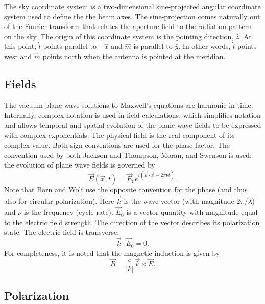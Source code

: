 \documentclass{article}
\begin{document}
The sky coordinate system is a two-dimensional sine-projected angular 
coordinate system used to define the the beam axes.  The sine-projection
comes naturally out of the Fourier transform that relates the aperture
field to the radiation pattern on the sky.  The origin of this coordinate 
system is the pointing direction, $\hat{z}$.  At this point, 
$\hat{l}$ points parallel to $-\hat{x}$ and $\hat{m}$ is parallel to $\hat{y}$.
In other words, $\hat{l}$ points west and $\hat{m}$ points north when the
antenna is pointed at the meridian.

\subsection{Fields}

The vacuum plane wave solutions to Maxwell's equations are harmonic in time.
Internally, complex notation is used in field calculations, which simplifies
notation and allows temporal and spatial evolution of the plane wave fields to 
be expressed with complex exponentials.  The physical
field is the real component of its complex value.  Both sign conventions are 
used for the phase factor.  The convention used by both Jackson and 
Thompson, Moran, and Swenson is used; the evolution of plane wave 
fields is governed by
\begin{equation} \label{eqn:phase}
\vec{E}(\vec{x}, t) = \vec{E}_0 e^{i (\vec{k} \cdot \vec{x} - 2 \pi \nu t)}.
\end{equation}
Note that Born and Wolf use the opposite convention for the phase (and thus
also for circular polarization).
Here $\vec{k}$ is the wave vector (with magnitude $2 \pi / \lambda$) and
$\nu$ is the frequency (cycle rate).  $\vec{E}_0$ is a vector quantity
with magnitude equal to the electric field strength.  The direction of the
vector describes its polarization state.  The electric field is
transverse:
\begin{equation}
\vec{k} \cdot \vec{E}_0 = 0.
\end{equation}
For completeness, it is noted that the magnetic induction is given by
\begin{equation}
\vec{B} = \frac{c}{|k|} \, \vec{k} \times \vec{E}.
\end{equation}

\subsection{Polarization}
\end{document}
